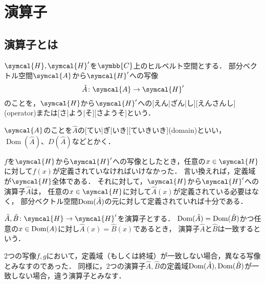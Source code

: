 \documentclass[../sotsu.tex]{subfiles}
\begin{document}
\section{演算子}

\subsection{演算子とは}

\begin{definition}[演算子]
    $\symcal{H}, \symcal{H}'$を$\symbb{C}$上のヒルベルト空間とする．
    部分ベクトル空間$\symcal{A}$から$\symcal{H}'$への写像
    \begin{equation*}
        \hat{A} \colon \symcal{A} \to \symcal{H}'
    \end{equation*}
    のことを，$\symcal{H}$から$\symcal{H}'$への[えん|ざん|し][えんさんし](operator)または[さ|よう|そ][さようそ]という．
\end{definition}

\begin{definition}[演算子の定義域]
    $\symcal{A}$のことを$\hat{A}$の[てい|ぎ|いき][ていきいき](domain)といい，$\operatorname{Dom}(\hat{A})$、$D(\hat{A})$などとかく．
\end{definition}

$f$を$\symcal{H}$から$\symcal{H}'$への写像としたとき，任意の$x \in \symcal{H}$に対して$f(x)$が定義されていなければいけなかった．
言い換えれば，定義域が$\symcal{H}$全体である．
それに対して，$\symcal{H}$から$\symcal{H}'$への演算子$\hat{A}$は，
任意の$x \in \symcal{H}$に対して$\hat{A}(x)$が定義されている必要はなく，
部分ベクトル空間$\operatorname{Dom}(\hat{A})$の元に対して定義されていれば十分である．


\begin{definition}[演算子の一致]
    $\hat{A}, \hat{B} \colon \symcal{H} \to \symcal{H}'$を演算子とする．
    $\operatorname{Dom}(\hat{A}) = \operatorname{Dom}(\hat{B})$かつ任意の$x \in \operatorname{Dom}(A)$に対し$\hat{A}(x) = \hat{B}(x)$であるとき，
    演算子$\hat{A}$と$\hat{B}$は一致するという．
\end{definition}

2つの写像$f, g$において，定義域（もしくは終域）が一致しない場合，異なる写像とみなすのであった．
同様に，2つの演算子$\hat{A}, \hat{B}$の定義域$\operatorname{Dom}(\hat{A}), \operatorname{Dom}(\hat{B})$が一致しない場合，違う演算子とみなす．

\par
\end{document}
